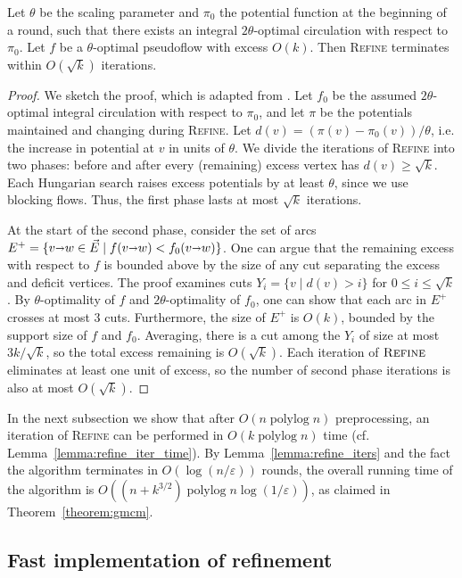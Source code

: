 \documentclass[a4paper,UKenglish]{socg-lipics-v2018}
\def\polylog{\mathop{\mathrm{polylog}}}
\def\eps{\varepsilon}
\def\arcto{\mathord\shortrightarrow}
\def\arc#1#2{#1\arcto#2}
\theoremstyle{plain}
\numberwithin{figure}{section}
\begin{document}
\begin{lemma}
\label{lemma:refine_iters}
Let $\theta$ be the scaling parameter and $\pi_0$ the potential function at the
beginning of a round, such that there exists an integral $2\theta$-optimal
circulation with respect to $\pi_0$.
Let $f$ be a $\theta$-optimal pseudoflow with excess $O(k)$.
Then \textsc{Refine} terminates within $O(\sqrt{k})$ iterations.
\end{lemma}
\begin{proof}
We sketch the proof, which is adapted from \cite{GHKT17}.
Let $f_0$ be the assumed $2\theta$-optimal integral circulation with respect to $\pi_0$,
and let $\pi$ be the potentials maintained and changing during \textsc{Refine}.
Let $d(v) = (\pi(v) - \pi_0(v))/\theta$, i.e. the increase in potential
at $v$ in units of $\theta$.
We divide the iterations of \textsc{Refine} into two phases: before and after
every (remaining) excess vertex has $d(v) \geq \sqrt{k}$.
Each Hungarian search raises excess potentials by at least $\theta$,
since we use blocking flows.
Thus, the first phase lasts at most $\sqrt{k}$ iterations.

At the start of the second phase, consider the set of arcs
$E^+ = \{\arc vw \in \vec{E} \mid f(\arc vw) < f_0(\arc vw)\}$.
One can argue that the remaining excess with respect to $f$ is bounded above by
the size of any cut separating the excess and deficit vertices.
The proof examines cuts $Y_i = \{v \mid d(v) > i\}$ for $0 \leq i \leq \sqrt{k}$.
By $\theta$-optimality of $f$ and $2\theta$-optimality of $f_0$, one can show
that each arc in $E^+$ crosses at most 3 cuts.
Furthermore, the size of $E^+$ is $O(k)$, bounded by the support size of $f$ and $f_0$.
Averaging, there is a cut among the $Y_i$ of size at most $3k/\sqrt{k}$,
so the total excess remaining is $O(\sqrt{k})$.
Each iteration of $\textsc{Refine}$ eliminates at least one unit of excess,
so the number of second phase iterations is also at most $O(\sqrt{k})$.
\end{proof}

In the next subsection we show that after $O(n\polylog n)$ preprocessing,
an iteration of \textsc{Refine} can be performed in $O(k\polylog n)$ time
(cf. Lemma~\ref{lemma:refine_iter_time}).
By Lemma~\ref{lemma:refine_iters} and the fact the algorithm terminates in
$O(\log(n/\eps))$ rounds, the overall running time of the algorithm is
$O((n + k^{3/2})\polylog n \log(1/\eps))$, as claimed in Theorem~\ref{theorem:gmcm}.

\subsection{Fast implementation of refinement}
\label{SS:fast_refine}
\end{document}
